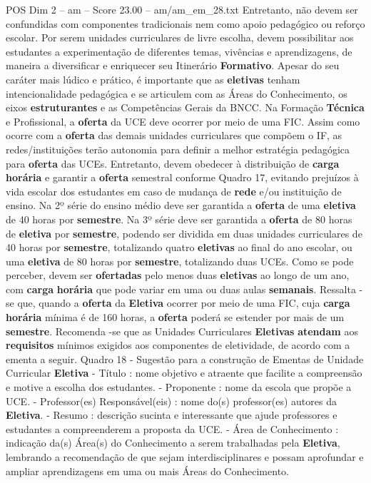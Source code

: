 \begin{textsample}{POS Dim 2 – am – Score 23.00 – am/am\_em\_28.txt}
Entretanto, não devem ser confundidas com componentes tradicionais nem como apoio pedagógico ou reforço escolar.
Por serem unidades curriculares de livre escolha, devem possibilitar aos estudantes a experimentação de diferentes temas, vivências e aprendizagens, de maneira a diversificar e enriquecer seu Itinerário \textbf{Formativo}.
Apesar do seu caráter mais lúdico e prático, é importante que as \textbf{eletivas} tenham intencionalidade pedagógica e se articulem com as Áreas do Conhecimento, os eixos \textbf{estruturantes} e as Competências Gerais da BNCC.
Na Formação \textbf{Técnica} e Profissional, a \textbf{oferta} da UCE deve ocorrer por meio de uma FIC.
Assim como ocorre com a \textbf{oferta} das demais unidades curriculares que compõem o IF, as redes/instituições terão autonomia para definir a melhor estratégia pedagógica para \textbf{oferta} das UCEs.
Entretanto, devem obedecer à distribuição de \textbf{carga} \textbf{horária} e garantir a \textbf{oferta} semestral conforme Quadro 17, evitando prejuízos à vida escolar dos estudantes em caso de mudança de \textbf{rede} e/ou instituição de ensino.
Na 2º série do ensino médio deve ser garantida a \textbf{oferta} de uma \textbf{eletiva} de 40 horas por \textbf{semestre}.
Na 3º série deve ser garantida a \textbf{oferta} de 80 horas de \textbf{eletiva} por \textbf{semestre}, podendo ser dividida em duas unidades curriculares de 40 horas por \textbf{semestre}, totalizando quatro \textbf{eletivas} ao final do ano escolar, ou uma \textbf{eletiva} de 80 horas por \textbf{semestre}, totalizando duas UCEs.
Como se pode perceber, devem ser \textbf{ofertadas} pelo menos duas \textbf{eletivas} ao longo de um ano, com \textbf{carga} \textbf{horária} que pode variar em uma ou duas aulas \textbf{semanais}.
Ressalta -se que, quando a \textbf{oferta} da \textbf{Eletiva} ocorrer por meio de uma FIC, cuja \textbf{carga} \textbf{horária} mínima é de 160 horas, a \textbf{oferta} poderá se estender por mais de um \textbf{semestre}.
Recomenda -se que as Unidades Curriculares \textbf{Eletivas} \textbf{atendam} aos \textbf{requisitos} mínimos exigidos aos componentes de eletividade, de acordo com a ementa a seguir.
Quadro 18 - Sugestão para a construção de Ementas de Unidade Curricular \textbf{Eletiva} - Título : nome objetivo e atraente que facilite a compreensão e motive a escolha dos estudantes. - Proponente : nome da escola que propõe a UCE. - Professor(es) Responsável(eis) : nome do(s) professor(es) autores da \textbf{Eletiva}. - Resumo : descrição sucinta e interessante que ajude professores e estudantes a compreenderem a proposta da UCE. - Área de Conhecimento : indicação da(s) Área(s) do Conhecimento a serem trabalhadas pela \textbf{Eletiva}, lembrando a recomendação de que sejam interdisciplinares e possam aprofundar e ampliar aprendizagens em uma ou mais Áreas do Conhecimento.

\end{textsample}
